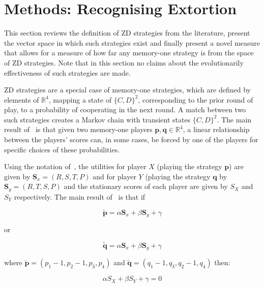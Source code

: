 \documentclass[a4paper]{article}
\begin{document}
\section{Methods: Recognising Extortion}\label{sec:sserror-zd-strategies}

This section reviews the definition of ZD
strategies from the literature, present the vector space in which such
strategies exist and finally present a novel measure that allows for a measure
of how far any memory-one strategy is from the space of ZD
strategies. Note that in this section no claims about the evolutionarily
effectiveness of such strategies are made.

ZD strategies are a special case of memory-one strategies,
which are defined by elements of \(\mathbb{R}^4\), mapping a state of
\({\{C, D\}}^2\), corresponding to the prior round of play, to a probability of
cooperating in the next round. A match between two such strategies creates a
Markov chain with transient states \({\{C, D\}}^2\). The main result
of~\cite{Press2012} is that given two memory-one players \(\textbf{p},
\textbf{q}\in\mathbb{R}^4\), a linear relationship between the players' scores can, in
some cases, be forced by one of the players for specific choices of these
probabilities.

Using the notation of~\cite{Press2012}, the utilities for player \(X\) (playing
the strategy \(\textbf{p}\))
are given by \(\textbf{S}_x=(R, S, T, P)\) and for player \(Y\) (playing the
strategy \(\textbf{q}\) by \(\textbf{S}_y=(R, T, S, P)\)
and the stationary scores of each player are given by \(S_X\) and \(S_Y\)
respectively. The main result of~\cite{Press2012} is that if

\begin{equation}\label{eqn:linear_relationship_for_p}
    \tilde{\textbf{p}}=\alpha \textbf{S}_x + \beta \textbf{S}_y + \gamma
\end{equation}

or

\begin{equation}\label{eqn:linear_relationship_for_q}
    \tilde{\textbf{q}}=\alpha \textbf{S}_x + \beta \textbf{S}_y + \gamma
\end{equation}

where \(\tilde{\textbf{p}} = (p_1 - 1, p_2 - 1, p_3, p_4)\) and
\(\tilde{\textbf{q}} = (q_1 - 1, q_3, q_2 - 1, q_4)\) then:

\begin{equation}
    \alpha S_X + \beta S_Y + \gamma = 0
\end{equation}
\end{document}
